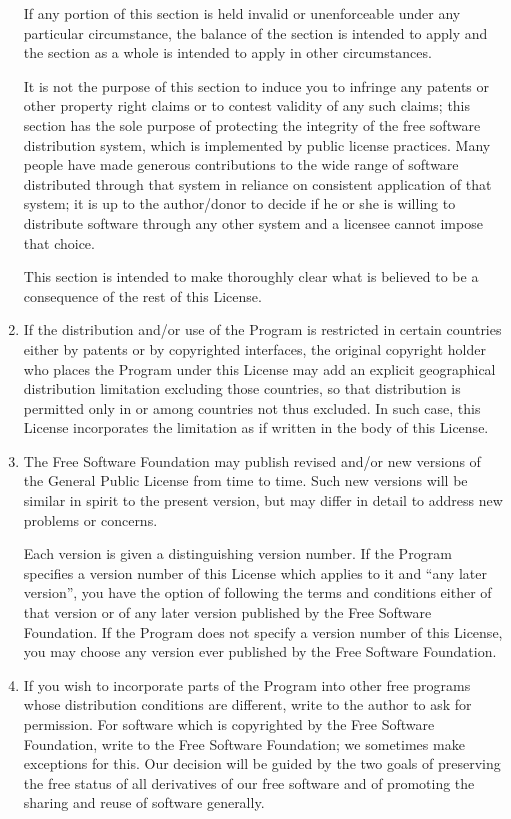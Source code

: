 \begin{lrbox}{\gpl}
\begin{minipage}{3\textwidth}
\begin{multicols}{3}
\begin{enumerate}
If any portion of this section is held invalid or unenforceable under
any particular circumstance, the balance of the section is intended to
apply and the section as a whole is intended to apply in other
circumstances.

It is not the purpose of this section to induce you to infringe any
patents or other property right claims or to contest validity of any
such claims; this section has the sole purpose of protecting the
integrity of the free software distribution system, which is
implemented by public license practices.  Many people have made
generous contributions to the wide range of software distributed
through that system in reliance on consistent application of that
system; it is up to the author/donor to decide if he or she is willing
to distribute software through any other system and a licensee cannot
impose that choice.

This section is intended to make thoroughly clear what is believed to
be a consequence of the rest of this License.

\item
If the distribution and/or use of the Program is restricted in
certain countries either by patents or by copyrighted interfaces, the
original copyright holder who places the Program under this License
may add an explicit geographical distribution limitation excluding
those countries, so that distribution is permitted only in or among
countries not thus excluded.  In such case, this License incorporates
the limitation as if written in the body of this License.

\item
The Free Software Foundation may publish revised and/or new versions
of the General Public License from time to time.  Such new versions will
be similar in spirit to the present version, but may differ in detail to
address new problems or concerns.

Each version is given a distinguishing version number.  If the Program
specifies a version number of this License which applies to it and ``any
later version'', you have the option of following the terms and conditions
either of that version or of any later version published by the Free
Software Foundation.  If the Program does not specify a version number of
this License, you may choose any version ever published by the Free Software
Foundation.

\item
If you wish to incorporate parts of the Program into other free
programs whose distribution conditions are different, write to the author
to ask for permission.  For software which is copyrighted by the Free
Software Foundation, write to the Free Software Foundation; we sometimes
make exceptions for this.  Our decision will be guided by the two goals
of preserving the free status of all derivatives of our free software and
of promoting the sharing and reuse of software generally.


\end{enumerate}
\end{multicols}
\end{minipage}
\end{lrbox}
